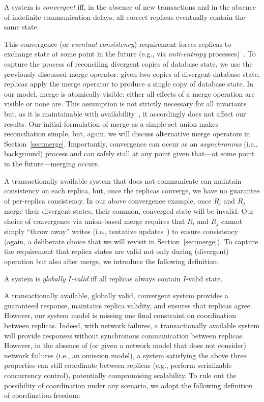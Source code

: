 \begin{definition}A system is \textit{convergent} iff, in the
absence of new transactions and in the absence of indefinite
communication delays, all correct replicas eventually contain the same
state.
\end{definition}

This convergence (or \textit{eventual consistency}) requirement forces
replicas to exchange state at some point in the future (e.g., via
\textit{anti-entropy} processes)~\cite{vogels-defs,bayou}. To capture
the process of reconciling divergent copies of database state, we use
the previously discussed merge operator: given two copies of divergent
database state, replicas apply the merge operator to produce a single
copy of database state. In our model, merge is atomically visible:
either all effects of a merge operation are visible or none are. This
assumption is not strictly necessary for all invariants but, as it is
maintainable with availability~\cite{ramp-txns}, it accordingly does
not affect our results. Our initial formulation of merge as a simple
set union makes reconciliation simple, but, again, we will discuss
alternative merge operators in Section~\ref{sec:merge}. Importantly,
convergence can occur as an \textit{asynchronous} (i.e., background)
process and can safely stall at any point given that---at some point
in the future---merging occurs.

 A transactionally available system
that does not communicate can maintain consistency on each replica,
but, once the replicas converge, we have no guarantee of per-replica
consistency. In our above convergence example, once $R_i$ and $R_j$
merge their divergent states, their common, converged state will be
invalid. Our choice of convergence via union-based merge requires that
$R_i$ and $R_j$ cannot simply ``throw away'' writes (i.e., tentative
updates~\cite{tamer-book}) to ensure consistency (again, a deliberate
choice that we will revisit in Section~\ref{sec:merge}). To capture
the requirement that replica states are valid not only during
(divergent) operation but also after merge, we introduce the following
definition:

\begin{definition}
A system is \textit{globally $I$-valid} iff all replicas always contain
$I$-valid state.
\end{definition}

 A transactionally available, globally valid,
convergent system provides a guaranteed response, maintains replica
validity, and ensures that replicas agree. However, our system model
is missing one final constraint on coordination between
replicas. Indeed, with network failures, a transactionally available
system will provide responses without synchronous communication
between replicas. However, in the absence of (or given a network model
that does not consider) network failures (i.e., an omission model), a
system satisfying the above three properties can still coordinate
between replicas (e.g., perform serializable concurrency control),
potentially compromising scalability. To rule out the possibility of
coordination under any scenario, we adopt the following definition of
coordination-freedom:

